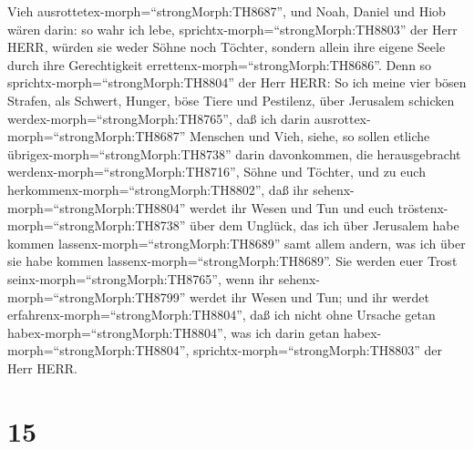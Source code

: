 Vieh ausrottetex-morph=``strongMorph:TH8687'',  und Noah,
Daniel und Hiob wären darin: so wahr ich lebe,
sprichtx-morph=``strongMorph:TH8803'' der Herr HERR, würden sie weder
Söhne noch Töchter, sondern allein ihre eigene Seele durch ihre
Gerechtigkeit errettenx-morph=``strongMorph:TH8686''.  Denn
so sprichtx-morph=``strongMorph:TH8804'' der Herr HERR: So ich meine
vier bösen Strafen, als Schwert, Hunger, böse Tiere und Pestilenz, über
Jerusalem schicken werdex-morph=``strongMorph:TH8765'', daß ich darin
ausrottex-morph=``strongMorph:TH8687'' Menschen und Vieh, 
siehe, so sollen etliche übrigex-morph=``strongMorph:TH8738'' darin
davonkommen, die herausgebracht werdenx-morph=``strongMorph:TH8716'',
Söhne und Töchter, und zu euch herkommenx-morph=``strongMorph:TH8802'',
daß ihr sehenx-morph=``strongMorph:TH8804'' werdet ihr Wesen und Tun und
euch tröstenx-morph=``strongMorph:TH8738'' über dem Unglück, das ich
über Jerusalem habe kommen lassenx-morph=``strongMorph:TH8689'' samt
allem andern, was ich über sie habe kommen
lassenx-morph=``strongMorph:TH8689''.  Sie werden euer
Trost seinx-morph=``strongMorph:TH8765'', wenn ihr
sehenx-morph=``strongMorph:TH8799'' werdet ihr Wesen und Tun; und ihr
werdet erfahrenx-morph=``strongMorph:TH8804'', daß ich nicht ohne
Ursache getan habex-morph=``strongMorph:TH8804'', was ich darin getan
habex-morph=``strongMorph:TH8804'',
sprichtx-morph=``strongMorph:TH8803'' der Herr HERR.

\hypertarget{section-14}{%
\section{15}\label{section-14}}

